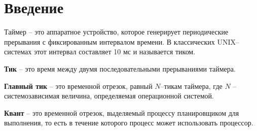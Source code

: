 \section*{Введение}

Таймер -- это аппаратное устройство, которое генерирует периодические прерывания с фиксированным интервалом времени. В классических UNIX--системах этот интервал составляет 10 мс и называется тиком. 

\textbf{Тик} -- это время между двумя последовательными прерываниями таймера.

\textbf{Главный тик} -- это временной отрезок, равный $N$--тикам таймера,  где $N$ -- системозависимая величина, определяемая операционной системой.

\textbf{Квант} -- это временной отрезок, выделяемый процессу планировщиком для выполнения, то есть в течение которого процесс может использовать процессор.